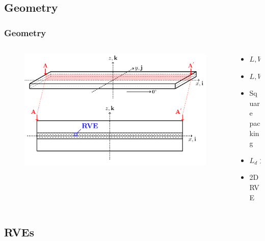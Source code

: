 \documentclass[first,firstsupp,lastsupp,last,hyperref,table]{ETHclass}
\begin{document}
\subsection{Geometry}

\begin{frame}
\frametitle{\vspace{0.2cm}\small Geometry}
\vspace{-1cm}
\centering
\begin{columns}[c]
\begin{column}{0.85\textwidth}
\begin{figure}
\centering
\includegraphics[width=\columnwidth]{laminate-section.pdf}
\end{figure}
\end{column}
\begin{column}{0.15\textwidth}
\scriptsize
\begin{itemize}[label=]
\item $L, W >> t$
\item $L, W \rightarrow \infty$
\item Square packing
\item$L_{d} >> \Delta\theta_{d}$
\item 2D RVE
\end{itemize}
\end{column}
\end{columns}
\end{frame}

\subsection{RVEs}
\end{document}
